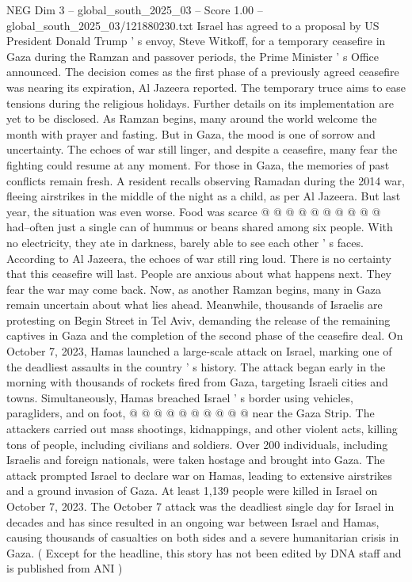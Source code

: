 \begin{textsample}{NEG Dim 3 – global\_south\_2025\_03 – Score 1.00 – global\_south\_2025\_03/121880230.txt}  \label{ex:f3_neg_426}
Israel has agreed to a proposal by US President Donald Trump ' s envoy, Steve Witkoff, for a temporary ceasefire in Gaza during the Ramzan and passover periods, the Prime Minister ' s Office announced.
The decision comes as the first phase of a previously agreed ceasefire was nearing its expiration, Al Jazeera reported.
The temporary truce aims to ease tensions during the religious holidays.
Further details on its implementation are yet to be disclosed.
As Ramzan begins, many around the world welcome the month with prayer and fasting.
But in Gaza, the mood is one of sorrow and uncertainty.
The echoes of war still linger, and despite a ceasefire, many fear the fighting could resume at any moment.
For those in Gaza, the memories of past conflicts remain fresh.
A resident recalls observing Ramadan during the 2014 war, fleeing airstrikes in the middle of the night as a child, as per Al Jazeera.
But last year, the situation was even worse.
Food was scarce @ @ @ @ @ @ @ @ @ @ had--often just a single can of hummus or beans shared among six people.
With no electricity, they ate in darkness, barely able to see each other ' s faces.
According to Al Jazeera, the echoes of war still ring loud.
There is no certainty that this ceasefire will last.
People are anxious about what happens next.
They fear the war may come back.
Now, as another Ramzan begins, many in Gaza remain uncertain about what lies ahead.
Meanwhile, thousands of Israelis are protesting on Begin Street in Tel Aviv, demanding the release of the remaining captives in Gaza and the completion of the second phase of the ceasefire deal.
On October 7, 2023, Hamas launched a large-scale attack on Israel, marking one of the deadliest assaults in the country ' s history.
The attack began early in the morning with thousands of rockets fired from Gaza, targeting Israeli cities and towns.
Simultaneously, Hamas breached Israel ' s border using vehicles, paragliders, and on foot, @ @ @ @ @ @ @ @ @ @ near the Gaza Strip.
The attackers carried out mass shootings, kidnappings, and other violent acts, killing tons of people, including civilians and soldiers.
Over 200 individuals, including Israelis and foreign nationals, were taken hostage and brought into Gaza.
The attack prompted Israel to declare war on Hamas, leading to extensive airstrikes and a ground invasion of Gaza.
At least 1,139 people were killed in Israel on October 7, 2023.
The October 7 attack was the deadliest single day for Israel in decades and has since resulted in an ongoing war between Israel and Hamas, causing thousands of casualties on both sides and a severe humanitarian crisis in Gaza. ( Except for the headline, this story has not been edited by DNA staff and is published from ANI )

\end{textsample}

